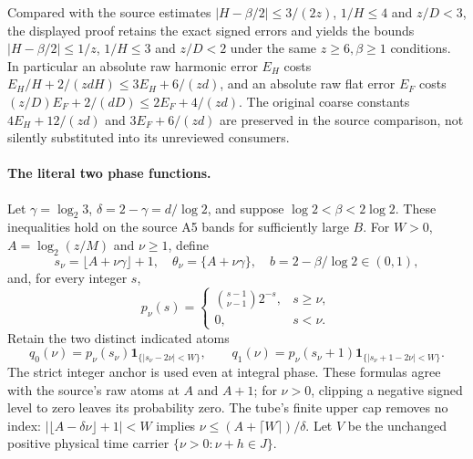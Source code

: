 Compared with the source estimates
$|H-\beta/2|\le3/(2z)$, $1/H\le4$ and $z/D<3$,
the displayed proof retains the exact signed errors and yields the
bounds $|H-\beta/2|\le1/z$, $1/H\le3$ and $z/D<2$
under the same $z\ge6,\beta\ge1$ conditions.
In particular an absolute raw harmonic error $E_H$ costs
$E_H/H+2/(zdH)\le3E_H+6/(zd)$, and an absolute raw flat
error $E_F$ costs $(z/D)E_F+2/(dD)\le2E_F+4/(zd)$.
The original coarse constants $4E_H+12/(zd)$ and
$3E_F+6/(zd)$ are preserved in the source comparison, not silently
substituted into its unreviewed consumers.

\paragraph{The literal two phase functions.}
Let $\gamma=\log_2 3$, $\delta=2-\gamma=d/\log2$, and suppose
$\log2<\beta<2\log2$. These inequalities hold on the source A5
bands for sufficiently large $B$.
For $W>0$, $A=\log_2(z/M)$ and $\nu\ge1$, define
\[
 s_\nu=\lfloor A+\nu\gamma\rfloor+1,\quad
 \theta_\nu=\{A+\nu\gamma\},\quad
 b=2-\beta/\log2\in(0,1),
\]
and, for every integer $s$,
\[
 p_\nu(s)=
 \begin{cases}\binom{s-1}{\nu-1}2^{-s},&s\ge\nu,\\0,&s<\nu.\end{cases}
\]
Retain the two distinct indicated atoms
\[
 q_0(\nu)=p_\nu(s_\nu)\mathbf1_{\{|s_\nu-2\nu|<W\}},\qquad
 q_1(\nu)=p_\nu(s_\nu+1)\mathbf1_{\{|s_\nu+1-2\nu|<W\}}.
\]
The strict integer anchor is used even at integral phase.
These formulas agree with the source's raw atoms at $A$ and $A+1$;
for $\nu>0$, clipping a negative signed level to zero leaves its
probability zero. The tube's finite upper cap removes no index:
$|\lfloor A-\delta\nu\rfloor+1|<W$ implies
$\nu\le(A+\lceil W\rceil)/\delta$.
Let $V$ be the unchanged positive physical time carrier
$\{\nu>0:\nu+h\in J\}$.

